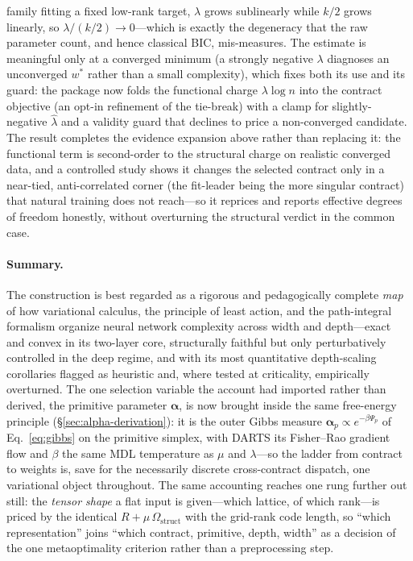 \documentclass[11pt]{article}
\theoremstyle{definition}
\newcommand{\alphapar}{\bm{\alpha}}
\begin{document}
family fitting a fixed low-rank target, $\lambda$ grows sublinearly while $k/2$ grows linearly, so
$\lambda/(k/2)\to 0$---which is exactly the degeneracy that the raw parameter count, and hence classical BIC,
mis-measures. The estimate is meaningful only at a converged minimum (a strongly negative $\lambda$ diagnoses
an unconverged $w^\ast$ rather than a small complexity), which fixes both its use and its guard: the package
now folds the functional charge $\lambda\log n$ into the contract objective (an opt-in refinement of the
tie-break) with a clamp for slightly-negative $\hat\lambda$ and a validity guard that declines to price a
non-converged candidate. The result completes the evidence expansion above rather than replacing it: the
functional term is second-order to the structural charge on realistic converged data, and a controlled
study shows it changes the selected contract only in a near-tied, anti-correlated corner (the fit-leader
being the more singular contract) that natural training does not reach---so it reprices and reports
effective degrees of freedom honestly, without overturning the structural verdict in the common case.

\paragraph{Summary.} The construction is best regarded as a rigorous and pedagogically
complete \emph{map} of how variational calculus, the principle of least action, and the
path-integral formalism organize neural network complexity across width and depth---exact and
convex in its two-layer core, structurally faithful but only perturbatively controlled in the
deep regime, and with its most quantitative depth-scaling corollaries flagged as heuristic and,
where tested at criticality, empirically overturned. The one selection variable the account had
imported rather than derived, the primitive parameter $\alphapar$, is now brought inside the same
free-energy principle (\S\ref{sec:alpha-derivation}): it is the outer Gibbs measure
$\alphapar_p\propto e^{-\beta\Psi_p}$ of Eq.~\eqref{eq:gibbs} on the primitive simplex, with DARTS its
Fisher--Rao gradient flow and $\beta$ the same MDL temperature as $\mu$ and $\lambda$---so the ladder
from contract to weights is, save for the necessarily discrete cross-contract dispatch, one variational
object throughout. The same accounting reaches one rung further out still: the \emph{tensor shape} a flat
input is given---which lattice, of which rank---is priced by the identical $R+\mu\,\Omega_{\mathrm{struct}}$
with the grid-rank code length, so ``which representation'' joins ``which contract, primitive, depth,
width'' as a decision of the one metaoptimality criterion rather than a preprocessing step.
\end{document}
